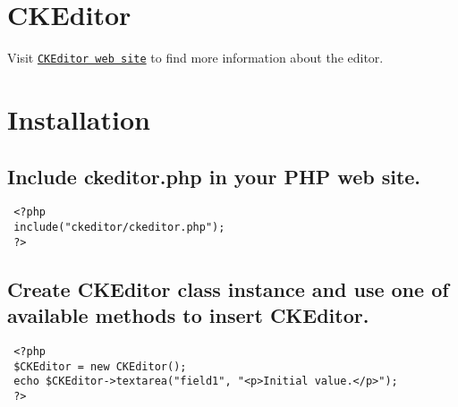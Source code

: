 \hypertarget{index_intro_sec}{}\section{CKEditor}\label{index_intro_sec}
Visit \href{http://ckeditor.com}{\tt CKEditor web site} to find more information about the editor. \hypertarget{index_install_sec}{}\section{Installation}\label{index_install_sec}
\hypertarget{index_step1}{}\subsection{Include ckeditor.php in your PHP web site.}\label{index_step1}


\begin{Code}\begin{verbatim} <?php
 include("ckeditor/ckeditor.php");
 ?>
\end{verbatim}
\end{Code}

 \hypertarget{index_step2}{}\subsection{Create CKEditor class instance and use one of available methods to insert CKEditor.}\label{index_step2}


\begin{Code}\begin{verbatim} <?php
 $CKEditor = new CKEditor();
 echo $CKEditor->textarea("field1", "<p>Initial value.</p>");
 ?>
\end{verbatim}
\end{Code}

 